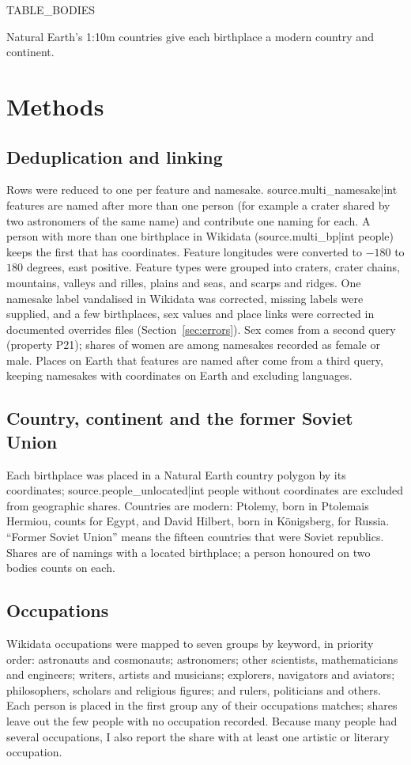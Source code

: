 \documentclass[11pt,a4paper]{article}
\begin{document}
{{TABLE_BODIES}}

Natural Earth's 1:10m countries \citep{naturalearth} give each birthplace a modern country and continent.

\section{Methods}\label{sec:methods}
\subsection{Deduplication and linking}
Rows were reduced to one per feature and namesake. {{source.multi_namesake|int}} features are named after more than one person (for example a crater shared by two astronomers of the same name) and contribute one naming for each. A person with more than one birthplace in Wikidata ({{source.multi_bp|int}} people) keeps the first that has coordinates. Feature longitudes were converted to $-180$ to $180$ degrees, east positive. Feature types were grouped into craters, crater chains, mountains, valleys and rilles, plains and seas, and scarps and ridges. One namesake label vandalised in Wikidata was corrected, missing labels were supplied, and a few birthplaces, sex values and place links were corrected in documented overrides files (Section~\ref{sec:errors}). Sex comes from a second query (property P21); shares of women are among namesakes recorded as female or male. Places on Earth that features are named after come from a third query, keeping namesakes with coordinates on Earth and excluding languages.

\subsection{Country, continent and the former Soviet Union}
Each birthplace was placed in a Natural Earth country polygon by its coordinates; {{source.people_unlocated|int}} people without coordinates are excluded from geographic shares. Countries are modern: Ptolemy, born in Ptolemais Hermiou, counts for Egypt, and David Hilbert, born in K\"onigsberg, for Russia. ``Former Soviet Union'' means the fifteen countries that were Soviet republics. Shares are of namings with a located birthplace; a person honoured on two bodies counts on each.

\subsection{Occupations}
Wikidata occupations were mapped to seven groups by keyword, in priority order: astronauts and cosmonauts; astronomers; other scientists, mathematicians and engineers; writers, artists and musicians; explorers, navigators and aviators; philosophers, scholars and religious figures; and rulers, politicians and others. Each person is placed in the first group any of their occupations matches; shares leave out the few people with no occupation recorded. Because many people had several occupations, I also report the share with at least one artistic or literary occupation.
\end{document}
